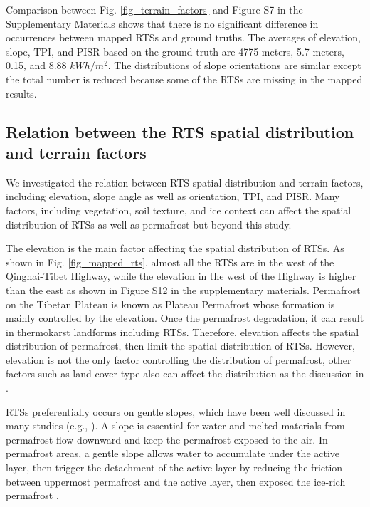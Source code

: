 \documentclass[preprint,12pt,authoryear]{elsarticle}
\begin{document}
Comparison between Fig. \ref{fig_terrain_factors} and Figure S7 in the Supplementary Materials shows that there is no significant difference in occurrences between mapped RTSs and ground truths. The averages of elevation, slope, TPI, and PISR based on the ground truth are 4775 meters, 5.7 meters, --0.15, and 8.88 $kWh/m^2$. The distributions of slope orientations are similar except the total number is reduced because some of the RTSs are missing in the mapped results. 

\subsection{Relation between the RTS spatial distribution and terrain factors}
\label{subsec_spatial_dis_terrain}

We investigated the relation between RTS spatial distribution and terrain factors, including elevation, slope angle as well as orientation, TPI, and PISR. Many factors, including vegetation, soil texture, and ice context can affect the spatial distribution of RTSs as well as permafrost but beyond this study. 

The elevation is the main factor affecting the spatial distribution of RTSs. As shown in Fig. \ref{fig_mapped_rts}, almost all the RTSs are in the west of the Qinghai-Tibet Highway, while the elevation in the west of the Highway is higher than the east as shown in Figure S12 in the supplementary materials. Permafrost on the Tibetan Plateau is known as Plateau Permafrost whose formation is mainly controlled by the elevation. Once the permafrost degradation, it can result in thermokarst landforms including RTSs. Therefore, elevation affects the spatial distribution of permafrost, then limit the spatial distribution of RTSs. However, elevation is not the only factor controlling the distribution of permafrost, other factors such as land cover type also can affect the distribution as the discussion in \citealp{yin2017effects}.

RTSs preferentially occurs on gentle slopes, which have been well discussed in many studies (e.g., \citealp{leibman1995cryogenic, niu2014thaw, lacelle_distribution_2015}). A slope is essential for water and melted materials from permafrost flow downward and keep the permafrost exposed to the air. In permafrost areas, a gentle slope allows water to accumulate under the active layer, then trigger the detachment of the active layer by reducing the friction between uppermost permafrost and the active layer, then exposed the ice-rich permafrost \citep{mcroberts1974stability, mcroberts1974the}. 
\end{document}
